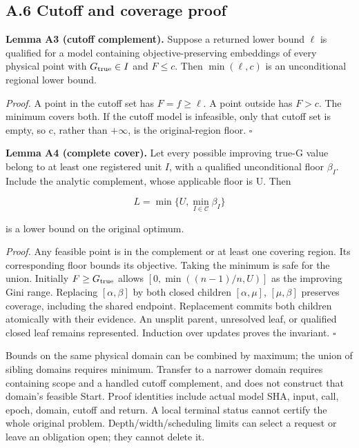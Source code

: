\documentclass[
  american,
  11pt,
]{article}
\begin{document}
\clearpage

\subsection{A.6 Cutoff and coverage
proof}\label{a.6-cutoff-and-coverage-proof}


\textbf{Lemma A3 (cutoff complement).} Suppose a returned lower bound
\(\ell\) is qualified for a model containing objective-preserving
embeddings of every physical point with \(G_{\rm true}\in I\) and
\(F\le c\). Then \(\min(\ell,c)\) is an unconditional regional lower
bound.

\emph{Proof.} A point in the cutoff set has \(F=f\ge\ell\). A point
outside has \(F>c\). The minimum covers both. If the cutoff model is
infeasible, only that cutoff set is empty, so c, rather than
\(+\infty\), is the original-region floor. \(\square\)


\textbf{Lemma A4 (complete cover).} Let every possible improving true-G
value belong to at least one registered unit \(I\), with a qualified
unconditional floor \(\beta_I\). Include the analytic complement, whose
applicable floor is U. Then

\[
L=\min\{U,\min_{I\in\mathcal C}\beta_I\}
\tag{A18}
\]

is a lower bound on the original optimum.

\emph{Proof.} Any feasible point is in the complement or at least one
covering region. Its corresponding floor bounds its objective. Taking
the minimum is safe for the union. Initially \(F\ge G_{\rm true}\)
allows \([0,\min((n-1)/n,U)]\) as the improving Gini range. Replacing
\([\alpha,\beta]\) by both closed children \([\alpha,\mu]\),
\([\mu,\beta]\) preserves coverage, including the shared endpoint.
Replacement commits both children atomically with their evidence. An
unsplit parent, unresolved leaf, or qualified closed leaf remains
represented. Induction over updates proves the invariant. \(\square\)

Bounds on the same physical domain can be combined by maximum; the union
of sibling domains requires minimum. Transfer to a narrower domain
requires containing scope and a handled cutoff complement, and does not
construct that domain's feasible Start. Proof identities include actual
model SHA, input, call, epoch, domain, cutoff and return. A local
terminal status cannot certify the whole original problem.
Depth/width/scheduling limits can select a request or leave an
obligation open; they cannot delete it.
\end{document}
